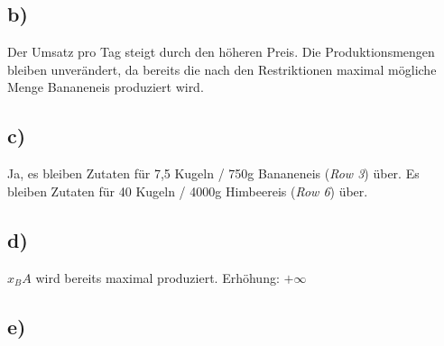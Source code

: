 \documentclass[a4paper,11pt]{article}
\begin{document}
\subsection*{b)}
Der Umsatz pro Tag steigt durch den höheren Preis.
Die Produktionsmengen bleiben unverändert, da bereits die nach den Restriktionen maximal mögliche Menge Bananeneis produziert wird.

\subsection*{c)}
Ja, es bleiben Zutaten für 7,5 Kugeln / 750g Bananeneis (\emph{Row 3}) über.
Es bleiben Zutaten für 40 Kugeln / 4000g Himbeereis (\emph{Row 6}) über.

\subsection*{d)}
$x_BA$ wird bereits maximal produziert. Erhöhung: $+ \infty$

\subsection*{e)}
\end{document}
